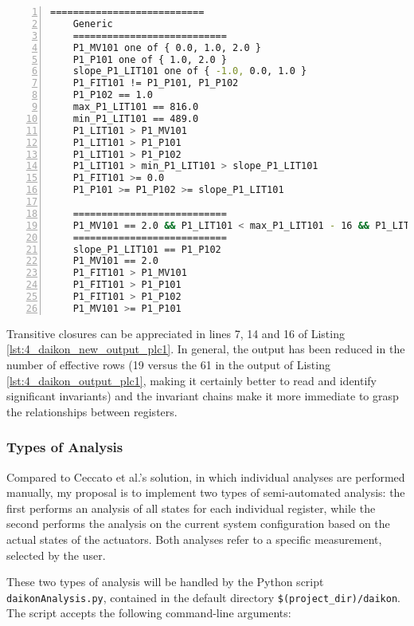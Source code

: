 \begin{lstlisting}[language=bash,numbers=left,caption={Revised Daikon output with transitive closures for \texttt{PLC1} of the iTrust SWaT system},label=lst:4_daikon_new_output_plc1]
	===========================
	Generic
	===========================
	P1_MV101 one of { 0.0, 1.0, 2.0 }
	P1_P101 one of { 1.0, 2.0 }
	slope_P1_LIT101 one of { -1.0, 0.0, 1.0 }
	P1_FIT101 != P1_P101, P1_P102
	P1_P102 == 1.0
	max_P1_LIT101 == 816.0
	min_P1_LIT101 == 489.0
	P1_LIT101 > P1_MV101
	P1_LIT101 > P1_P101
	P1_LIT101 > P1_P102
	P1_LIT101 > min_P1_LIT101 > slope_P1_LIT101
	P1_FIT101 >= 0.0
	P1_P101 >= P1_P102 >= slope_P1_LIT101
	
	===========================
	P1_MV101 == 2.0 && P1_LIT101 < max_P1_LIT101 - 16 && P1_LIT101 > min_P1_LIT101 + 15
	===========================
	slope_P1_LIT101 == P1_P102
	P1_MV101 == 2.0
	P1_FIT101 > P1_MV101
	P1_FIT101 > P1_P101
	P1_FIT101 > P1_P102
	P1_MV101 >= P1_P101
\end{lstlisting}
Transitive closures can be appreciated in lines 7, 14 and 16 of Listing \ref{lst:4_daikon_new_output_plc1}.\newline
In general, the output has been reduced in the number of effective rows (19 versus the 61 in the output of Listing \ref{lst:4_daikon_output_plc1}, making it certainly better to read and identify significant invariants) and the invariant chains make it more immediate to grasp the relationships between registers.
\vfill

\subsubsection{Types of Analysis}
\label{subsub:4_types_analysis}

Compared to Ceccato et al.'s solution, in which individual analyses are performed manually, my proposal is to implement two types of semi-automated analysis: the first performs an analysis of all states for each individual register, while the second performs the analysis on the current system configuration based on the actual states of the actuators.\newline
Both analyses refer to a specific measurement, selected by the user.

\bigskip
These two types of analysis will be handled by the Python script\\ \texttt{daikonAnalysis.py}, contained in the default directory \texttt{\$(project\_dir)/daikon}.\newline
The script accepts the following command-line arguments:

